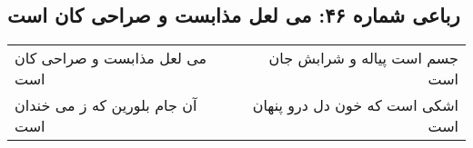 \begin{center}
\section*{رباعی شماره ۴۶: می لعل مذابست و صراحی کان است}
\label{sec:sh046}
\begin{longtable}{l p{0.5cm} r}
می لعل مذابست و صراحی کان است
&&
جسم است پیاله و شرابش جان است
\\
آن جام بلورین که ز می خندان است
&&
اشکی است که خون دل درو پنهان است
\\
\end{longtable}
\end{center}
